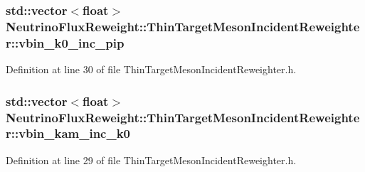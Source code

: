 \hypertarget{class_neutrino_flux_reweight_1_1_thin_target_meson_incident_reweighter_a468f0c6421e61b547e1c14a06e23ee81}{
\subsubsection[{vbin\-\_\-k0\-\_\-inc\-\_\-pip}]{\setlength{\rightskip}{0pt plus 5cm}std\-::vector$<$float$>$ Neutrino\-Flux\-Reweight\-::\-Thin\-Target\-Meson\-Incident\-Reweighter\-::vbin\-\_\-k0\-\_\-inc\-\_\-pip}}\label{class_neutrino_flux_reweight_1_1_thin_target_meson_incident_reweighter_a468f0c6421e61b547e1c14a06e23ee81}


Definition at line 30 of file Thin\-Target\-Meson\-Incident\-Reweighter.\-h.

\hypertarget{class_neutrino_flux_reweight_1_1_thin_target_meson_incident_reweighter_a613978871a5d27998977245f7f9d0b69}{
\subsubsection[{vbin\-\_\-kam\-\_\-inc\-\_\-k0}]{\setlength{\rightskip}{0pt plus 5cm}std\-::vector$<$float$>$ Neutrino\-Flux\-Reweight\-::\-Thin\-Target\-Meson\-Incident\-Reweighter\-::vbin\-\_\-kam\-\_\-inc\-\_\-k0}}\label{class_neutrino_flux_reweight_1_1_thin_target_meson_incident_reweighter_a613978871a5d27998977245f7f9d0b69}


Definition at line 29 of file Thin\-Target\-Meson\-Incident\-Reweighter.\-h.

